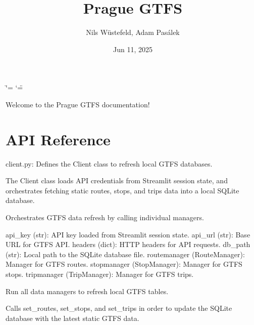 \documentclass[letterpaper,10pt,english]{sphinxmanual}
\title{Prague GTFS}
\date{Jun 11, 2025}
\author{Nils Wüstefeld, Adam Pasálek}
\begin{document}
\ifdefined\shorthandoff
  \ifnum\catcode`\=\string=\active\shorthandoff{=}\fi
  \ifnum\catcode`\"=\active{}\fi
\fi

\pagestyle{empty}
\sphinxmaketitle
\pagestyle{plain}
\sphinxtableofcontents
\pagestyle{normal}
\label{\detokenize{index::doc}}


\sphinxAtStartPar
Welcome to the Prague GTFS documentation!

\sphinxstepscope


\chapter{API Reference}
\label{\detokenize{api:module-client}}\label{\detokenize{api:api-reference}}\label{\detokenize{api::doc}}
\sphinxAtStartPar
client.py: Defines the Client class to refresh local GTFS databases.

\sphinxAtStartPar
The Client class loads API credentials from Streamlit session state,
and orchestrates fetching static routes, stops, and trips data
into a local SQLite database.

\begin{fulllineitems}
\label{\detokenize{api:client.Client}}
\pysigstartsignatures
{}
\pysigstopsignatures
\sphinxAtStartPar
Orchestrates GTFS data refresh by calling individual managers.
\begin{description}
\sphinxAtStartPar
api\_key (str): API key loaded from Streamlit session state.
api\_url (str): Base URL for GTFS API.
headers (dict): HTTP headers for API requests.
db\_path (str): Local path to the SQLite database file.
routemanager (RouteManager): Manager for GTFS routes.
stopmanager (StopManager): Manager for GTFS stops.
tripmanager (TripManager): Manager for GTFS trips.

\end{description}

\begin{fulllineitems}
\label{\detokenize{api:client.Client.run}}
\pysigstartsignatures
{}
\pysigstopsignatures
\sphinxAtStartPar
Run all data managers to refresh local GTFS tables.

\sphinxAtStartPar
Calls set\_routes, set\_stops, and set\_trips in order to
update the SQLite database with the latest static GTFS data.

\end{fulllineitems}


\end{fulllineitems}
\end{document}

